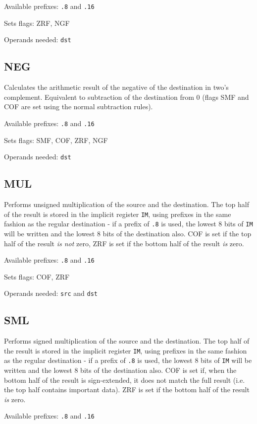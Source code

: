 \documentclass[12pt,a4paper]{report}
\begin{document}
Available prefixes: \texttt{.8} and \texttt{.16}

Sets flags: ZRF, NGF

Operands needed: \texttt{dst}

\subsection*{NEG}
Calculates the arithmetic result of the negative of the destination in two's complement. Equivalent to subtraction of the destination from 0 (flags SMF and COF are set using the normal subtraction rules).

Available prefixes: \texttt{.8} and \texttt{.16}

Sets flags: SMF, COF, ZRF, NGF

Operands needed: \texttt{dst}

\subsection*{MUL}
Performs unsigned multiplication of the source and the destination. The top half of the result is stored in the implicit register \texttt{IM}, using prefixes in the same fashion as the regular destination - if a prefix of \texttt{.8} is used, the lowest 8 bits of \texttt{IM} will be written and the lowest 8 bits of the destination also. COF is set if the top half of the result \emph{is not} zero, ZRF is set if the bottom half of the result \emph{is} zero.

Available prefixes: \texttt{.8} and \texttt{.16}

Sets flags: COF, ZRF

Operands needed: \texttt{src} and \texttt{dst}

\subsection*{SML}
Performs signed multiplication of the source and the destination. The top half of the result is stored in the implicit register \texttt{IM}, using prefixes in the same fashion as the regular destination - if a prefix of \texttt{.8} is used, the lowest 8 bits of \texttt{IM} will be written and the lowest 8 bits of the destination also. COF is set if, when the bottom half of the result is sign-extended, it does not match the full result (i.e. the top half contains important data). ZRF is set if the bottom half of the result \emph{is} zero.

Available prefixes: \texttt{.8} and \texttt{.16}
\end{document}

